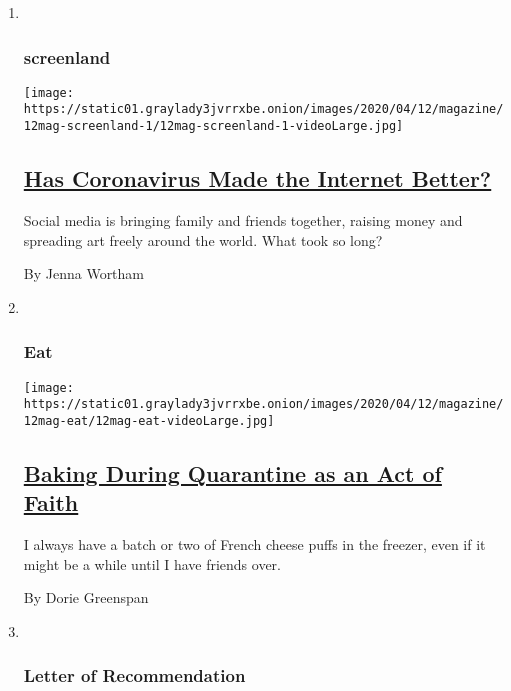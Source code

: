 \begin{enumerate}
\def\labelenumi{\arabic{enumi}.}
\item ~
  \hypertarget{screenland}{%
  \subsubsection{screenland}\label{screenland}}

  \texttt{[image: https://static01.graylady3jvrrxbe.onion/images/2020/04/12/magazine/12mag-screenland-1/12mag-screenland-1-videoLarge.jpg]}

  \hypertarget{has-coronavirus-made-the-internet-better}{%
  \subsection{\texorpdfstring{\href{/2020/04/06/magazine/d-nice-has-coronavirus-made-the-internet-better.html}{Has
  Coronavirus Made the Internet
  Better?}}{Has Coronavirus Made the Internet Better?}}\label{has-coronavirus-made-the-internet-better}}

  Social media is bringing family and friends together, raising money
  and spreading art freely around the world. What took so long?

  By Jenna Wortham
\item ~
  \hypertarget{eat}{%
  \subsubsection{Eat}\label{eat}}

  \texttt{[image: https://static01.graylady3jvrrxbe.onion/images/2020/04/12/magazine/12mag-eat/12mag-eat-videoLarge.jpg]}

  \hypertarget{baking-during-quarantine-as-an-act-of-faith}{%
  \subsection{\texorpdfstring{\href{/2020/04/08/magazine/gougeres-french-cheese-puffs-recipe.html}{Baking
  During Quarantine as an Act of
  Faith}}{Baking During Quarantine as an Act of Faith}}\label{baking-during-quarantine-as-an-act-of-faith}}

  I always have a batch or two of French cheese puffs in the freezer,
  even if it might be a while until I have friends over.

  By Dorie Greenspan
\item ~
  \hypertarget{letter-of-recommendation}{%
  \subsubsection{Letter of
  Recommendation}\label{letter-of-recommendation}}


\end{enumerate}
